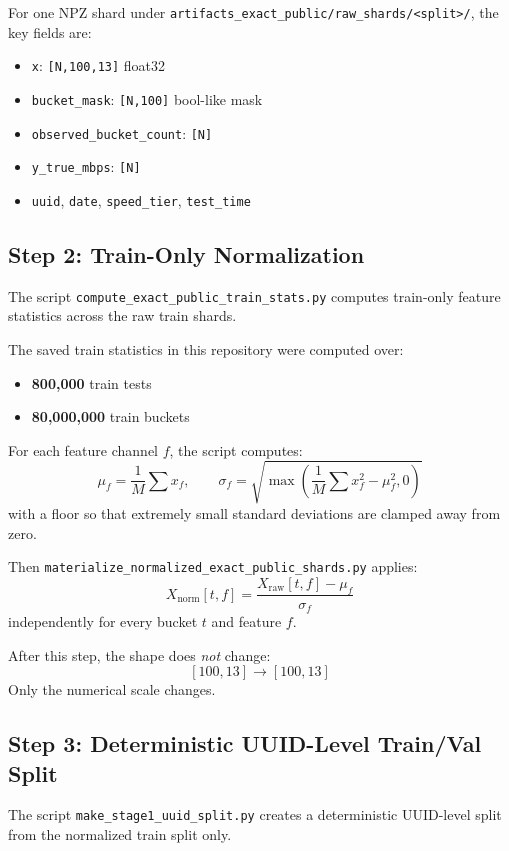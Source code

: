 \documentclass[11pt]{article}
\begin{document}
For one NPZ shard under \texttt{artifacts\_exact\_public/raw\_shards/<split>/}, the key fields are:
\begin{itemize}
\item \texttt{x}: \texttt{[N,100,13]} float32
\item \texttt{bucket\_mask}: \texttt{[N,100]} bool-like mask
\item \texttt{observed\_bucket\_count}: \texttt{[N]}
\item \texttt{y\_true\_mbps}: \texttt{[N]}
\item \texttt{uuid}, \texttt{date}, \texttt{speed\_tier}, \texttt{test\_time}
\end{itemize}

\subsection{Step 2: Train-Only Normalization}

The script \texttt{compute\_exact\_public\_train\_stats.py} computes train-only feature statistics across the raw train shards.

The saved train statistics in this repository were computed over:
\begin{itemize}
\item \textbf{800,000} train tests
\item \textbf{80,000,000} train buckets
\end{itemize}

For each feature channel \(f\), the script computes:
\[
\mu_f = \frac{1}{M}\sum x_f,\qquad
\sigma_f = \sqrt{\max\left(\frac{1}{M}\sum x_f^2 - \mu_f^2, 0\right)}
\]
with a floor so that extremely small standard deviations are clamped away from zero.

Then \texttt{materialize\_normalized\_exact\_public\_shards.py} applies:
\[
X_{\text{norm}}[t,f] = \frac{X_{\text{raw}}[t,f] - \mu_f}{\sigma_f}
\]
independently for every bucket \(t\) and feature \(f\).

After this step, the shape does \emph{not} change:
\[
[100,13] \rightarrow [100,13]
\]
Only the numerical scale changes.

\subsection{Step 3: Deterministic UUID-Level Train/Val Split}

The script \texttt{make\_stage1\_uuid\_split.py} creates a deterministic UUID-level split from the normalized train split only.
\end{document}
